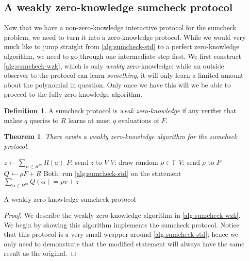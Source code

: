 \documentclass[english]{reedthesis}
\theoremstyle{plain}
\newtheorem{thm}{Theorem}[section]
\theoremstyle{definition}
\newtheorem{defn}[defn]{Definition}
\theoremstyle{remark}
\begin{document}
\subsection{A weakly zero-knowledge sumcheck protocol}

Now that we have a non-zero-knowledge interactive protocol for the sumcheck
problem, we need to turn it into a zero-knowledge protocol. While we would very
much like to jump straight from \cref{alg:sumcheck-std} to a perfect
zero-knowledge algorithm, we need to go through one intermediate step first. We
first construct \cref{alg:sumcheck-wzk}, which is only \emph{weakly}
zero-knowledge: while an outside observer to the protocol can learn
\emph{something}, it will only learn a limited amount about the polynomial in
question. Only once we have this will we be able to proceed to the fully
zero-knowledge algorithm.

\begin{defn}\label{def:weak-zk}
  A sumcheck protocol is \emph{weak zero-knowledge} if any verifier that makes
  $q$ queries to $R$ learns at most $q$ evaluations of $F$.
\end{defn}

\begin{thm}
  There exists a weakly zero-knowledge algorithm for the sumcheck protocol.
\end{thm}

\begin{algorithm}[htbp]
  $z \leftarrow \sum_{\alpha \in H^{m}}R(a)$\;
  $P$: send $z$ to $V$\;
  $V$: draw random $\rho \in \mathbb{F}$\;
  $V$: send $\rho$ to $P$\;
  $Q \leftarrow \rho F + R$\;
  Both: run \cref{alg:sumcheck-std} on the statement $\sum_{\alpha \in H^{m}}Q(\alpha) = \rho v + z$\;
  \caption{A weakly zero-knowledge sumcheck protocol~\cite[Construction
    5.4]{BCFGRS17}}\label{alg:sumcheck-wzk}
\end{algorithm}

\begin{proof}
  We describe the weakly zero-knowledge algorithm in \cref{alg:sumcheck-wzk}. We
  begin by showing this algorithm implements the sumcheck protocol. Notice that
  this protocol is a very small wrapper around \cref{alg:sumcheck-std}; hence we
  only need to demonstrate that the modified statement will always have the same
  result as the original.
\end{proof}
\end{document}
